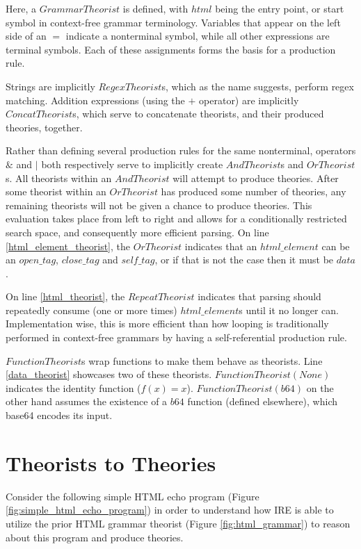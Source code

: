 Here, a $GrammarTheorist$ is defined, with $html$ being the entry point, or start symbol in context-free grammar terminology.
Variables that appear on the left side of an $=$ indicate a nonterminal symbol, while all other expressions are terminal symbols.
Each of these assignments forms the basis for a production rule.

Strings are implicitly $RegexTheorist$s, which as the name suggests, perform regex matching.
Addition expressions (using the $+$ operator) are implicitly $ConcatTheorist$s, which serve to concatenate theorists, and their produced theories, together.

Rather than defining several production rules for the same nonterminal, operators $\&$ and $|$ both respectively serve to implicitly create $AndTheorist$s and $OrTheorist$s.
All theorists within an $AndTheorist$ will attempt to produce theories.
After some theorist within an $OrTheorist$ has produced some number of theories, any remaining theorists will not be given a chance to produce theories.
This evaluation takes place from left to right and allows for a conditionally restricted search space, and consequently more efficient parsing.
On line \ref{html_element_theorist}, the $OrTheorist$ indicates that an $html\_element$ can be an $open\_tag$, $close\_tag$ and $self\_tag$, or if that is not the case then it must be $data$.

On line \ref{html_theorist}, the $RepeatTheorist$ indicates that parsing should repeatedly consume (one or more times) $html\_element$s until it no longer can.
Implementation wise, this is more efficient than how looping is traditionally performed in context-free grammars by having a self-referential production rule.

$FunctionTheorist$s wrap functions to make them behave as theorists.
Line \ref{data_theorist} showcases two of these theorists.
$FunctionTheorist(None)$ indicates the identity function ($f(x)=x$).
$FunctionTheorist(b64)$ on the other hand assumes the existence of a $b64$ function (defined elsewhere), which base64 encodes its input.


\section{Theorists to Theories}

Consider the following simple HTML echo program (Figure \ref{fig:simple_html_echo_program}) in order to understand how IRE is able to utilize the prior HTML grammar theorist (Figure \ref{fig:html_grammar}) to reason about this program and produce theories.

